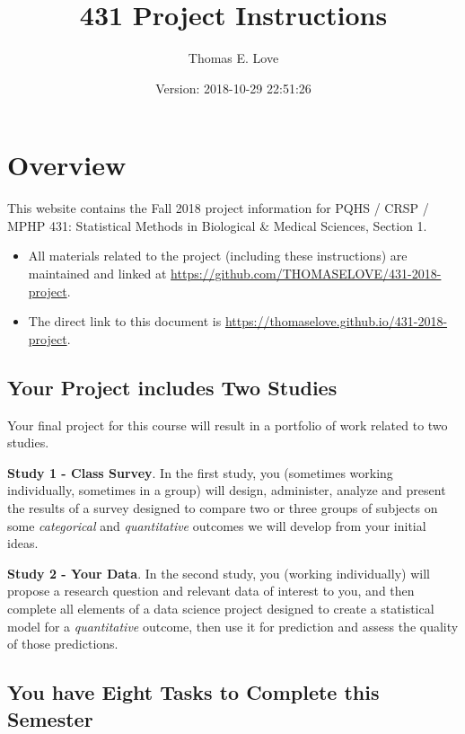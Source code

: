 \documentclass[]{book}
\title{431 Project Instructions}
\author{Thomas E. Love}
\date{Version: 2018-10-29 22:51:26}
\providecommand{\tightlist}{%
  \setlength{\itemsep}{0pt}\setlength{\parskip}{0pt}}
\theoremstyle{definition}
\theoremstyle{definition}
\theoremstyle{definition}
\theoremstyle{remark}
\begin{document}
\maketitle

{
\setcounter{tocdepth}{1}
\tableofcontents
}
\hypertarget{overview}{%
\chapter*{Overview}\label{overview}}

This website contains the Fall 2018 project information for PQHS / CRSP
/ MPHP 431: Statistical Methods in Biological \& Medical Sciences,
Section 1.

\begin{itemize}
\tightlist
\item
  All materials related to the project (including these instructions)
  are maintained and linked at
  \url{https://github.com/THOMASELOVE/431-2018-project}.
\item
  The direct link to this document is
  \url{https://thomaselove.github.io/431-2018-project}.
\end{itemize}

\hypertarget{your-project-includes-two-studies}{%
\section*{Your Project includes Two
Studies}\label{your-project-includes-two-studies}}

Your final project for this course will result in a portfolio of work
related to two studies.

\textbf{Study 1 - Class Survey}. In the first study, you (sometimes
working individually, sometimes in a group) will design, administer,
analyze and present the results of a survey designed to compare two or
three groups of subjects on some \emph{categorical} and
\emph{quantitative} outcomes we will develop from your initial ideas.

\textbf{Study 2 - Your Data}. In the second study, you (working
individually) will propose a research question and relevant data of
interest to you, and then complete all elements of a data science
project designed to create a statistical model for a \emph{quantitative}
outcome, then use it for prediction and assess the quality of those
predictions.

\hypertarget{you-have-eight-tasks-to-complete-this-semester}{%
\section*{You have Eight Tasks to Complete this
Semester}\label{you-have-eight-tasks-to-complete-this-semester}}
\end{document}
